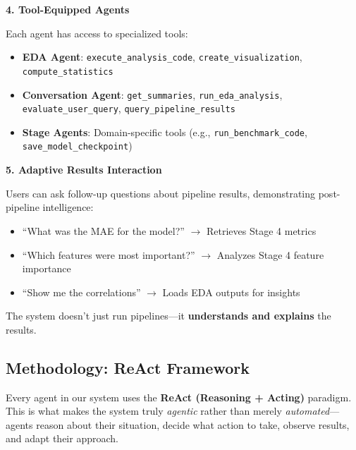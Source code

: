 \documentclass[11pt,a4paper]{article}
\begin{document}
\textbf{4. Tool-Equipped Agents}

Each agent has access to specialized tools:
\begin{itemize}
    \item \textbf{EDA Agent}: \texttt{execute\_analysis\_code}, \texttt{create\_visualization}, \texttt{compute\_statistics}
    \item \textbf{Conversation Agent}: \texttt{get\_summaries}, \texttt{run\_eda\_analysis}, \texttt{evaluate\_user\_query}, \texttt{query\_pipeline\_results}
    \item \textbf{Stage Agents}: Domain-specific tools (e.g., \texttt{run\_benchmark\_code}, \texttt{save\_model\_checkpoint})
\end{itemize}

\textbf{5. Adaptive Results Interaction}

Users can ask follow-up questions about pipeline results, demonstrating post-pipeline intelligence:
\begin{itemize}
    \item ``What was the MAE for the model?'' $\rightarrow$ Retrieves Stage 4 metrics
    \item ``Which features were most important?'' $\rightarrow$ Analyzes Stage 4 feature importance
    \item ``Show me the correlations'' $\rightarrow$ Loads EDA outputs for insights
\end{itemize}

The system doesn't just run pipelines---it \textbf{understands and explains} the results.

\subsection{Methodology: ReAct Framework}

Every agent in our system uses the \textbf{ReAct (Reasoning + Acting)} paradigm. This is what makes the system truly \textit{agentic} rather than merely \textit{automated}---agents reason about their situation, decide what action to take, observe results, and adapt their approach.
\end{document}
